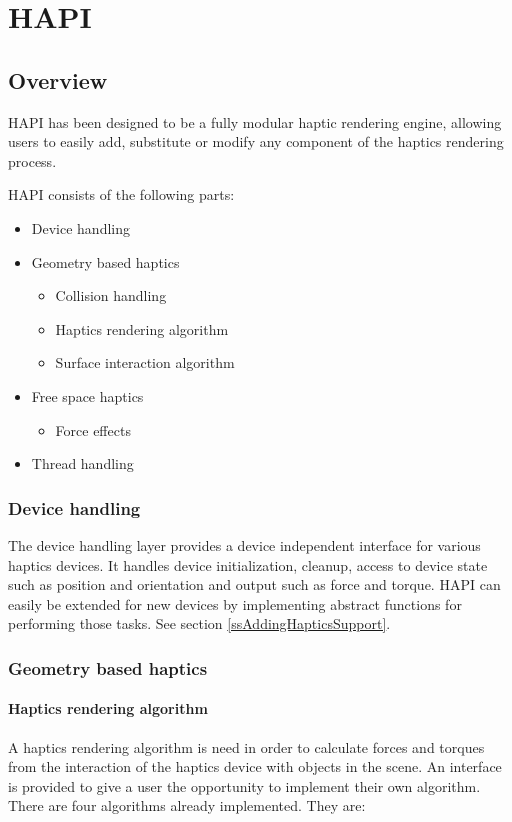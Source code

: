
\chapter {HAPI}


\section{Overview}

HAPI has been designed to be a fully modular haptic rendering engine,
allowing users to easily add, substitute or modify any component of the
haptics rendering process. 

HAPI consists of the following parts:

\begin{itemize}
\item Device handling
\item Geometry based haptics
\begin{itemize} 
\item Collision handling
\item Haptics rendering algorithm
\item Surface interaction algorithm
\end{itemize}
\item Free space haptics
\begin{itemize}
\item Force effects
\end{itemize}
\item Thread handling
\end{itemize}


\subsection{Device handling}
The device handling layer provides a device independent interface for various haptics devices. It handles device initialization, cleanup, access to device state such as position and orientation and output such as force and torque. HAPI can easily be extended for new devices by implementing abstract functions for performing those tasks. See section \ref{ssAddingHapticsSupport}.

\subsection{Geometry based haptics}

\subsubsection{Haptics rendering algorithm}
A haptics rendering algorithm is need in order to calculate forces and
torques from the interaction of the haptics device with objects in the scene. An interface is provided to give a user the opportunity to implement their own
algorithm. There are four algorithms already implemented. They are:

